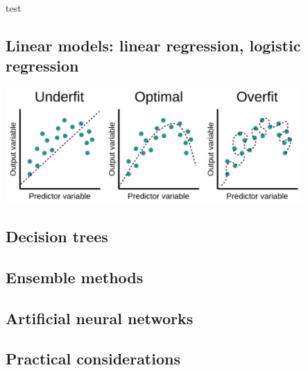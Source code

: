 
test

%

\subsection{Linear models: linear regression, logistic regression}

\begin{center}\includegraphics[width=0.85\textwidth]{img/machine/MachineOverUnderFiting.png}\end{center}

\subsection{Decision trees}

\subsection{Ensemble methods}

\subsection{Artificial neural networks}

\subsection{Practical considerations}